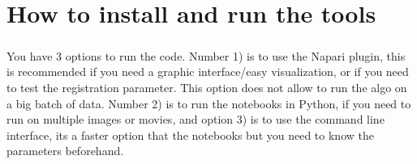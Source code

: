 \documentclass[10pt,a4paper]{book}
\begin{document}
\chapter{How to install and run the tools}

\paragraph{}You have 3 options to run the code. Number 1) is to use the Napari plugin, this is recommended if you need a graphic interface/easy visualization, or if you need to test the registration parameter. This option does not allow to run the algo on a big batch of data. Number 2) is to run the notebooks in Python, if you need to run on multiple images or movies, and option 3) is to use the command line interface, its a faster option that the notebooks but you need to know the parameters beforehand.
\end{document}
